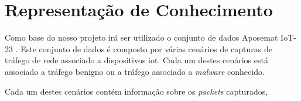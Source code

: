 
\section{Representação de Conhecimento}

Como base do nosso projeto irá ser utilizado o conjunto de dados Aposemat IoT-23 \parencite{sebastian_garcia_2020_4743746}. Este conjunto de dados é composto por várias cenários de capturas de tráfego de rede associado a dispositivos \acrshort{iot}. Cada um destes cenários está associado a tráfego benigno ou a tráfego associado a \textit{malware} conhecido.

Cada um destes cenários contém informação sobre os \textit{packets} capturados, 